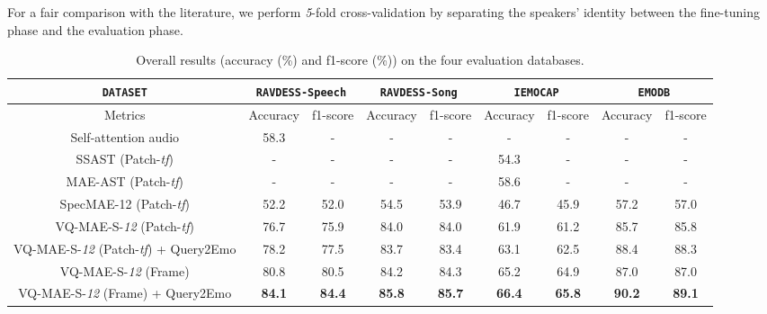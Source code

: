 \documentclass{article}
\begin{document}
For a fair comparison with the literature, we perform \emph{5}-fold cross-validation by separating the speakers' identity between the fine-tuning phase and the evaluation phase.

\begin{table*}[t]
\centering
\caption{Overall results (accuracy (\%) and f1-score (\%)) on the four evaluation databases.}
\label{tab:my-table}
\begin{tabular}{c|cc|cc|cc|cc}
\texttt{DATASET} & \multicolumn{2}{c|}{\texttt{RAVDESS-Speech}} & \multicolumn{2}{c|}{\texttt{RAVDESS-Song}} & \multicolumn{2}{c|}{\texttt{IEMOCAP}} & \multicolumn{2}{c}{\texttt{EMODB}} \\ \hline
Metrics & Accuracy           & f1-score          & Accuracy          & f1-score         & Accuracy           & f1-score           & Accuracy          & f1-score          \\ \hline
Self-attention audio \cite{chumachenko2022self}        & 58.3               &   -          & -              &     -       &      -         &      -        &        -      &          -     \\
SSAST \cite{gong2022ssast} (Patch-\emph{tf})        &  -      &   -          & -              &     -       &      54.3         &      -        &        -      &          -     \\
MAE-AST \cite{baade2022mae} (Patch-\emph{tf}) &  -      &   -          & -              &     -       &      58.6         &      -        &        -      &          - \\
SpecMAE-12 (Patch-\emph{tf})        &  52.2      &   52.0          & 54.5              &     53.9       &      46.7         &      45.9        &        57.2      & 57.0    \\ \hline
VQ-MAE-S-\emph{12}  (Patch-\emph{tf})      &   76.7             &      75.9       &        84.0     &    84.0        &    61.9           &   61.2           &    85.7          &      85.8       \\
VQ-MAE-S-\emph{12} (Patch-\emph{tf}) + Query2Emo        & 78.2               &   77.5          &       83.7       &      83.4      &    63.1           &   62.5           &      88.4        &  88.3           \\
VQ-MAE-S-\emph{12} (Frame)       & 80.8               &   80.5          &       84.2       &      84.3      &    65.2           &   64.9           &      87.0        &  87.0       \\  
VQ-MAE-S-\emph{12} (Frame) + Query2Emo      & \textbf{84.1}               &   \textbf{84.4}          &       \textbf{85.8}       &      \textbf{85.7}      &    \textbf{66.4}           &   \textbf{65.8}           &      \textbf{90.2}        &  \textbf{89.1}          
        
\end{tabular}
\end{table*}
\end{document}
